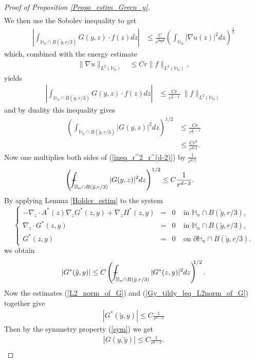 \documentclass[11pt, reqno]{amsart}
\theoremstyle{definition}
\theoremstyle{remark}
\numberwithin{equation}{section}
\def\Xint#1{\mathchoice
	{\XXint\displaystyle\textstyle{#1}}%
	{\XXint\textstyle\scriptstyle{#1}}%
	{\XXint\scriptstyle\scriptscriptstyle{#1}}%
	{\XXint\scriptscriptstyle\scriptscriptstyle{#1}}%
	\!\int}
\def\XXint#1#2#3{{\setbox0=\hbox{$#1{#2#3}{\int}$ }
		\vcenter{\hbox{$#2#3$ }}\kern-.6\wd0}}
\def\dashint{\Xint-}        %
\begin{document}
\begin{appendices}
\begin{proof}[Proof of \textup{Proposition \ref{Propo_estim_Green_y}}]
\begin{align*}
		\end{align*}
		We then use the Sobolev inequality to get
		\begin{align}
			\left| \int_{\mathbb{H}_n\cap B(\tilde{y},r/3)} G(y ,z)\cdot f(z) dz \right|
			&\leq  \frac{C}{r^\frac{d-2}{2}}	\left(\int_{\mathbb{H}_n} |\nabla u(z)|^{2} dz\right)^{\!\!\!\frac{1}{2}}\nonumber
		\end{align}
		which, combined with  the energy estimate \begin{align*}
			\|\nabla u \|_{L^{2}(\mathbb{H}_n)}
			&\leq  Cr\| f \|_{L^{2}(\mathbb{H}_n)},
		\end{align*}
		yields
		\begin{align*}
			\left| \int_{\mathbb{H}_n\cap B(\tilde{y},r/3)} G(y ,z)\cdot f(z) dz \right|
			&\leq  \frac{Cr}{r^{\frac{d}{2}-1}}	\; \| f \|_{L^{2}(\mathbb{H}_n)}
		\end{align*}
		and by duality this inequality gives
		\begin{align}
			\left( \int_{\mathbb{H}_n\cap B(\tilde{y},r/3)} |G(y ,z)|^2 dz \right)^{1/2}
			&\leq  \frac{Cr}{r^{\frac{d}{2}-1}}	\nonumber\\
			&\leq  \frac{Cr^2}{r^{d/2}}	\label{ineq_r^2_r^(d-2)}.
		\end{align}
		Now one multiplies both sides of (\ref{ineq_r^2_r^(d-2)}) by $\frac{1}{r^{d/2}}$ 
		\begin{align}
			\left( \dashint_{\mathbb{H}_n\cap B(\tilde{y},r/3)} |G(y ,z)|^2 dz \right)^{1/2}
			&\leq  C \frac{1}{r^{d-2}} \label{L2_norm_of_G}.
		\end{align}
		By applying Lemma \ref{Holder_estim} to the system
		\begin{equation*}
			\left\{
			\begin{array}{rcll}
				-\nabla_z\cdot A^* (z)  \nabla_z G^*(z,y) +  \nabla_z \Pi^*(z,y)&=&0 \ &\mbox{in } \mathbb{H}_n\cap B(\tilde{y},r/3),\\
				\nabla_z\cdot G^*(z,y)&=& 0 \;  &\mbox{in } \mathbb{H}_n\cap B(\tilde{y},r/3),\\
				G^*(z,y) &=& 0  & \mbox{on } \partial \mathbb{H}_n\cap B(\tilde{y},r/3) .
			\end{array}
			\right. 
		\end{equation*}
		we obtain 
		\begin{align}
			|  G^*(\tilde{y},y)   |\leq C	\left(\dashint_{\mathbb{H}_n\cap B(\tilde{y},r/3)} |   G^*(z,y)      |^2 dz\right)^{\!\!\!1/2}.\label{Gy_tildy_leq_L2norm_of_G}
		\end{align}
		Now the  estimates (\ref{L2_norm_of_G}) and  (\ref{Gy_tildy_leq_L2norm_of_G}) together give
		\begin{align*}
			|  G^*(\tilde{y},y)   |\leq C	\frac{1}{r^{d-2}} 
		\end{align*}
		Then by the symmetry property (\ref{sym}) we get
		\begin{align*}
			|  G(y,\tilde{y})   |\leq C	\frac{1}{r^{d-2}} .\\
		\end{align*}
		

\end{proof}
\end{appendices}
\end{document}
